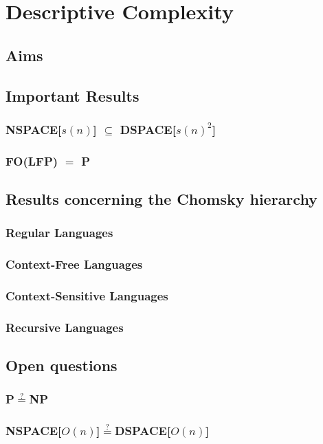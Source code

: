 \chapter{Descriptive Complexity}\label{ch:descriptive-complexity}


\section{Aims}\label{sec:aims}


\section{Important Results}\label{sec:important-results}

\subsection{NSPACE[$s(n)$] $\subseteq$ DSPACE[$s(n)^2$]}\label{subsec:nspacesubsetdspacesquared}

\subsection{FO(LFP) $=$ P}\label{subsec:fo(lfp)=p}

\section{Results concerning the Chomsky hierarchy}\label{sec:results-concerning-the-chomsky-hierarchy}

\subsection{Regular Languages}\label{subsec:des-regular-languages}

\subsection{Context-Free Languages}\label{subsec:des-context-free-languages}

\subsection{Context-Sensitive Languages}\label{subsec:des-context-sensitive-languages}

\subsection{Recursive Languages}\label{subsec:des-recursive-languages}

\section{Open questions}\label{sec:open-questions}

\subsection{P$\overset{?}{=}$NP}\label{subsec:pnp}

\subsection{NSPACE[$O(n)$]$\overset{?}{=}$DSPACE[$O(n)$]}\label{subsec:nspacedspace}